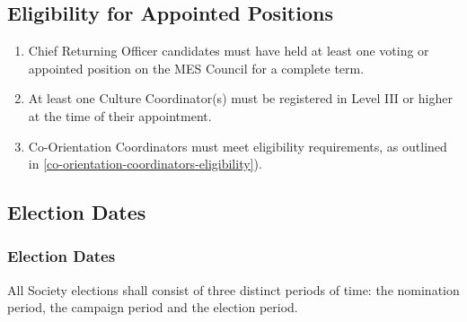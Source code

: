 \subsection{Eligibility for Appointed Positions}
\label{eligibility-for-appointed-positions}

\begin{enumerate}
 \item
  Chief Returning Officer candidates must have held at least one voting
  or appointed position on the MES Council for a complete term.
 \item
  At least one Culture Coordinator(s) must be registered in Level III or
  higher at the time of their appointment.
 \item
  Co-Orientation Coordinators must meet eligibility requirements, as
  outlined in \ref{co-orientation-coordinators-eligibility}).
\end{enumerate}

\subsection{Election Dates}
\label{election-dates}

\subsubsection{Election Dates}
\label{election-dates-1}
All Society elections shall consist of three distinct periods of time:
the nomination period, the campaign period and the election period.

